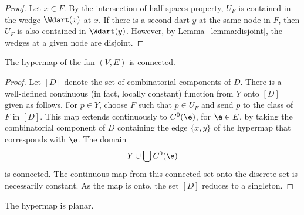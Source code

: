 \begin{proof}  Let $x\in F$.  By the intersection of half-spaces property, $U_F$ is contained in the wedge $\Wdart(x)$ at $x$.  If there is a second dart $y$ at the same node in $F$, then $U_F$ is also contained in $\Wdart(y)$. However, by Lemma~\ref{lemma:disjoint}, the wedges at a given node are disjoint.
\end{proof}

\begin{corollary}  
The hypermap of the fan $(V,E)$ is connected.
\end{corollary}
%
%
%


\begin{proof}  Let $[D]$ denote the set of combinatorial components of $D$.
There is a well-defined continuous (in fact, locally constant) function from $Y$ onto $[D]$ given as follows.  For $p\in Y$, choose $F$ such that $p\in U_F$ and send $p$ to the class of $F$ in $[D]$.   This map extends continuously to $C^0(\e)$, for $\e\in E$, by taking the combinatorial component of $D$ containing the edge $\{x,y\}$ of the hypermap that corresponds with $\e$.  The domain
$$
Y\cup \bigcup C^0(\e)
$$
is connected.  The continuous map from this connected set onto the discrete set is necessarily constant.  As the map is onto, the set $[D]$ reduces to a singleton.
\end{proof}

\begin{corollary}  
The hypermap is planar.
\end{corollary}
%
%

